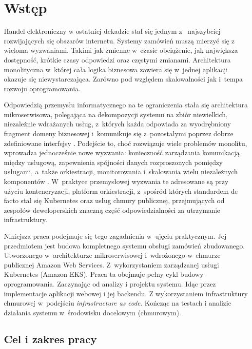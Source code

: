 \chapter*{Wstęp}
{}
\label{chap:wstep}

Handel elektroniczny w ostatniej dekadzie stał się jednym z ~najszybciej rozwijających się
obszarów internetu. Systemy zamówień muszą mierzyć się z wieloma wyzwaniami.
Takimi jak zmienne w~czasie obciążenie, jak największa dostępność, krótkie czasy odpowiedzi oraz częstymi zmianami.
Architektura monolityczna w~której cała logika biznesowa zawiera się w~jednej aplikacji okazuje się niewystarczająca.
Zarówno pod względem skalowalności jak i~tempa rozwoju oprogramowania.

Odpowiedzią przemysłu informatycznego na te ograniczenia stała się architektura mikroserwisowa, 
polegająca na dekompozycji systemu na zbiór niewielkich, niezależnie wdrażanych usług, 
z~których każda odpowiada za wyodrębniony fragment domeny biznesowej i~komunikuje się z~pozostałymi 
poprzez dobrze zdefiniowane interfejsy \parencite{newman2021}. Podejście to, choć rozwiązuje wiele problemów monolitu, 
wprowadza jednocześnie nowe wyzwania: konieczność zarządzania komunikacją między usługową, zapewnienia spójności 
danych rozproszonych pomiędzy usługami, a~także orkiestracji, monitorowania i~skalowania wielu niezależnych komponentów \parencite{richardson2018}. 
W~praktyce przemysłowej wyzwania te adresowane są przy użyciu konteneryzacji, platform orkiestracji, z~spośród 
których standardem de facto stał się Kubernetes \parencite{burns2022} oraz usług chmury publicznej, przejmujących 
od zespołów deweloperskich znaczną część odpowiedzialności za utrzymanie infrastruktury.

Niniejsza praca podejmuje się tego zagadnienia w~ujęciu praktycznym. Jej przedmiotem jest budowa kompletnego systemu 
obsługi zamówień zbudowanego. Utworzonego w~architekturze mikroserwisowej i~wdrożonego w~chmurze publicznej Amazon Web Services.
Z~wykorzystaniem zarządzanej usługi Kubernetes (Amazon EKS). Praca ta obejmuje pełny cykl budowy oprogramowania.
Zaczynając od analizy i projektu systemu. Idąc przez implementacje aplikacji webowej i jej backendu. Z wykorzystaniem
infrastruktury chmurowej w~podejściu \emph{infrastructure as code}. Kończąc na testach i analizie działania systemu
w~środowisku docelowym (chmurowym).

\section*{Cel i zakres pracy}
{}
\label{sec:cel-i-zakres-pracy}

